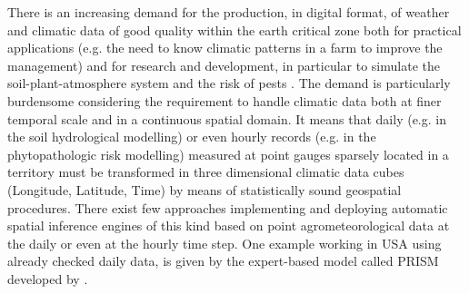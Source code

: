 \documentclass[authoryear,preprint,review,12pt]{elsarticle}
\newcommand{\note}[1]{\emph{\textcolor{red}{#1}}}
\begin{document}
There is an increasing demand for the production, in digital format, of weather and climatic data of good quality within the earth critical zone both 
    for practical applications (e.g. the need to know climatic patterns in a farm to improve the management)
    and
    for research and development, in particular to simulate the soil-plant-atmosphere system \citep{Hoogenboom:agrometeo-swat:2000,Jones:swat:2003,Seneviratne:swat:2010} %
    and the risk of pests \citep{Orlandini:plasmopara:2008,Rossi:vitenet:2014}.
The demand is particularly burdensome considering the requirement to handle climatic data both at finer temporal scale and in a continuous spatial domain.
It means that daily (e.g. in the soil hydrological modelling) or even hourly records (e.g. in the phytopathologic risk modelling) measured at point gauges sparsely located in a territory must be transformed in three dimensional climatic data cubes (Longitude, Latitude, Time) by means of statistically sound geospatial procedures.
There exist few approaches implementing and deploying automatic spatial inference engines of this kind based on point agrometeorological data at the daily or even at the hourly time step.
One example working in USA using already checked daily data, is given by the expert-based model called PRISM developed by  \cite{Daly08_PRISM_USA}. %
\end{document}
